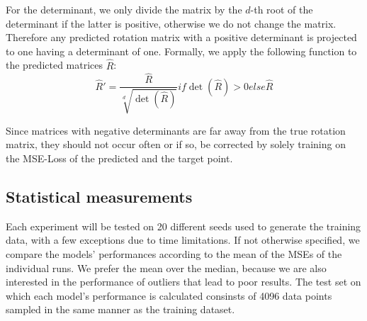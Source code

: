 For the determinant, we only divide the matrix by the $d$-th root of the determinant if the latter is positive, otherwise we do not change the matrix. Therefore any predicted rotation matrix with a positive determinant is projected to one having a determinant of one. Formally, we apply the following function to the predicted matrices $\hat{R}$:
\[\hat{R}' = \frac{\hat{R}}{\sqrt[d]{\det(\hat{R})}} if \det(\hat{R}) > 0 else \hat{R} \]

Since matrices with negative determinants are far away from the true rotation matrix, they should not occur often or if so, be corrected by solely training on the MSE-Loss of the predicted and the target point. 

\subsection{Statistical measurements}
Each experiment will be tested on 20 different seeds used to generate the training data, with a few exceptions due to time limitations. If not otherwise specified, we compare the models' performances according to the mean of the MSEs of the individual runs. We prefer the mean over the median, because we are also interested in the performance of outliers that lead to poor results. The test set on which each model's performance is calculated consinsts of 4096 data points sampled in the same manner as the training dataset.\\



\[   \]








\clearpage


